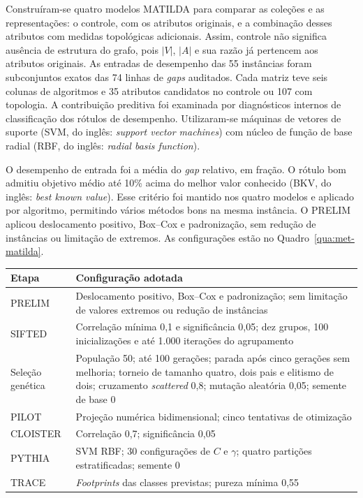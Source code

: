 Construíram-se quatro modelos MATILDA para comparar as coleções e as
representações: o controle, com os atributos originais, e a combinação
desses atributos com medidas topológicas adicionais. Assim, controle não
significa ausência de estrutura do grafo, pois $|V|$, $|A|$ e sua razão
já pertencem aos atributos originais. As entradas de desempenho das 55
instâncias foram subconjuntos exatos das 74 linhas de \textit{gaps} auditados. Cada matriz teve seis colunas de
algoritmos e 35 atributos candidatos no controle ou 107 com topologia.
A contribuição preditiva foi examinada por diagnósticos internos de
classificação dos rótulos de desempenho. Utilizaram-se máquinas de vetores
de suporte (SVM, do inglês: \textit{support vector machines}) com núcleo
de função de base radial (RBF, do inglês: \textit{radial basis function}).

O desempenho de entrada foi a média do \textit{gap} relativo, em fração. O rótulo
bom admitiu objetivo médio até 10\% acima do melhor valor conhecido
(BKV, do inglês: \textit{best known value}). Esse critério foi mantido
nos quatro modelos e aplicado por algoritmo, permitindo vários métodos
bons na mesma instância. O PRELIM aplicou
deslocamento positivo, Box--Cox e padronização, sem redução de instâncias
ou limitação de extremos. As configurações estão no
Quadro~\ref{qua:met-matilda}.

\begin{quadro}[htbp]
\centering
\caption{Parâmetros do fluxo MATILDA nos quatro modelos.}
\label{qua:met-matilda}
\begin{singlespace}
\normalsize
\begin{tabular}{|p{2.2cm}|p{10.8cm}|}
\hline
\textbf{Etapa} & \textbf{Configuração adotada} \\
\hline
PRELIM & Deslocamento positivo, Box--Cox e padronização; sem limitação de valores extremos ou redução de instâncias \\
\hline
SIFTED & Correlação mínima 0,1 e significância 0,05; dez grupos, 100 inicializações e até 1.000 iterações do agrupamento \\
\hline
Seleção genética & População 50; até 100 gerações; parada após cinco gerações sem melhoria; torneio de tamanho quatro, dois pais e elitismo de dois; cruzamento \textit{scattered} 0,8; mutação aleatória 0,05; semente de base 0 \\
\hline
PILOT & Projeção numérica bidimensional; cinco tentativas de otimização \\
\hline
CLOISTER & Correlação 0,7; significância 0,05 \\
\hline
PYTHIA & SVM RBF; 30 configurações de $C$ e $\gamma$; quatro partições estratificadas; semente 0 \\
\hline
TRACE & \textit{Footprints} das classes previstas; pureza mínima 0,55 \\
\hline
\end{tabular}
\par\smallskip
{}
\end{singlespace}
\end{quadro}

